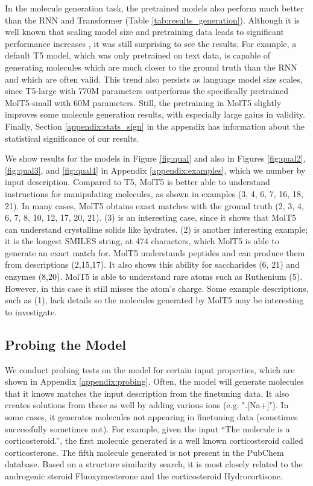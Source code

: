In the molecule generation task, the pretrained models also perform much better than the RNN and Transformer (Table \ref{tab:results_generation}). Although it is well known that scaling model size and pretraining data leads to significant performance increases \cite{kaplan2020scaling}, it was still surprising to see the results. For example, a default T5 model, which was only pretrained on text data, is capable of generating molecules which are much closer to the ground truth than the RNN and which are often valid. This trend also persists as language model size scales, since T5-large with 770M parameters outperforms the specifically pretrained MolT5-small with 60M parameters. Still, the pretraining in MolT5 slightly improves some molecule generation results, with especially large gains in validity. Finally, Section \ref{appendix:stats_sign} in the appendix has information about the statistical significance of our results.


We show results for the models in Figure \ref{fig:qual} and also in Figures \ref{fig:qual2}, \ref{fig:qual3}, and \ref{fig:qual4} in Appendix \ref{appendix:examples}, which we number by input description. Compared to T5, MolT5 is better able to understand instructions for manipulating molecules, as shown in examples (3, 4, 6, 7, 16, 18, 21). In many cases, MolT5 obtains exact matches with the ground truth (2, 3, 4, 6, 7, 8, 10, 12, 17, 20, 21). (3) is an interesting case, since it shows that MolT5 can understand crystalline solids like hydrates. (2) is another interesting example; it is the longest SMILES string, at 474 characters, which MolT5 is able to generate an exact match for. MolT5 understands peptides and can produce them from descriptions (2,15,17). It also shows this ability for saccharides (6, 21) and enzymes (8,20). MolT5 is able to understand rare atoms such as Ruthenium (5). However, in this case it still misses the atom's charge. Some example descriptions, such as (1), lack details so the molecules generated by MolT5 may be interesting to investigate. 





\subsection{Probing the Model}

We conduct probing tests on the model for certain input properties, which are shown in Appendix \ref{appendix:probing}. Often, the model will generate molecules that it knows matches the input description from the finetuning data. It also creates solutions from these as well by adding various ions (e.g. ".[Na+]"). In some cases, it generates molecules not appearing in finetuning data (sometimes successfully sometimes not). For example, given the input ``The molecule is a corticosteroid.'', the first molecule generated is a well known corticosteroid called corticosterone. The fifth molecule generated is not present in the PubChem database. Based on a structure similarity search, it is most closely related to the androgenic steroid Fluoxymesterone and the corticosteroid Hydrocortisone.
